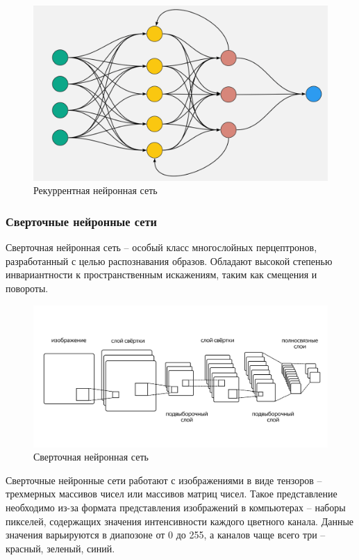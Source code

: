 \begin{figure}[h]
	\centering
	\includegraphics[width=0.7\linewidth]{images/RNN}
	\caption{Рекуррентная нейронная сеть}
	\label{fig:rnn}
\end{figure}

\subsubsection{Сверточные нейронные сети}

Сверточная нейронная сеть -- особый класс многослойных перцептронов, разработанный с целью распознавания образов. Обладают высокой степенью инвариантности к пространственным искажениям, таким как смещения и повороты.

\begin{figure}[h]
	\centering
	\includegraphics[width=0.7\linewidth]{images/CNN}
	\caption{Сверточная нейронная сеть}
	\label{fig:cnn}
\end{figure}

Сверточные нейронные сети работают с изображениями в виде тензоров -- трехмерных массивов чисел или массивов матриц чисел. Такое представление необходимо из-за формата представления изображений в компьютерах -- наборы пикселей, содержащих значения интенсивности каждого цветного канала. Данные значения варьируются в диапозоне от 0 до 255, а каналов чаще всего три -- красный, зеленый, синий.

